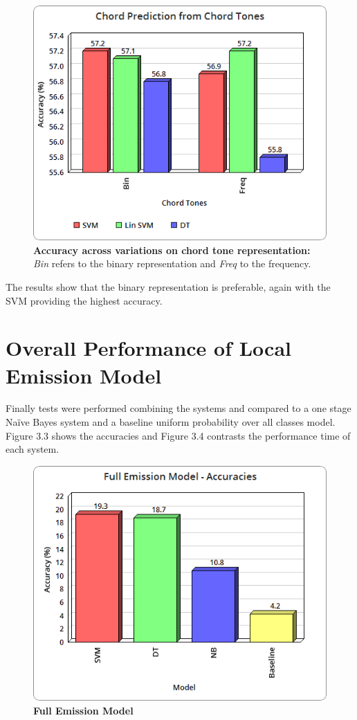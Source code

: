 \documentclass[bsc,singlespacing,parskip,deptreport]{infthesis}
\begin{document}
\begin{figure}
  \caption{\textbf{Accuracy across variations on chord tone representation:} \emph{Bin} refers to the binary representation and \emph{Freq} to the frequency.}
  \centering
    \includegraphics[scale=0.5]{ch}
\end{figure}

The results show that the binary representation is preferable, again with the SVM providing the highest accuracy.

\section{Overall Performance of Local Emission Model}

Finally tests were performed combining the systems and compared to a one stage Na\"ive Bayes system and a baseline uniform probability over all classes model. Figure 3.3 shows the accuracies and Figure 3.4 contrasts the performance time of each system.

\begin{figure}
  \caption{\textbf{Full Emission Model}}
  \centering
    \includegraphics[scale=0.5]{em}
\end{figure}
\end{document}
